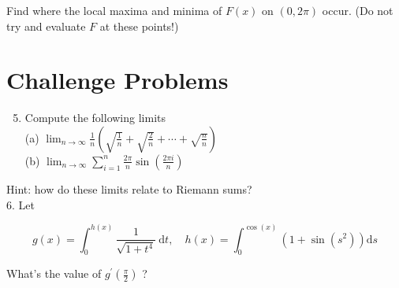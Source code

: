 \documentclass[10pt]{article}
\begin{document}
Find where the local maxima and minima of $F(x)$ on $(0,2 \pi)$ occur. (Do not try and evaluate $F$ at these points!)

\section*{Challenge Problems}
\begin{enumerate}
  \setcounter{enumi}{4}
  \item Compute the following limits\\
(a) $\lim _{n \rightarrow \infty} \frac{1}{n}\left(\sqrt{\frac{1}{n}}+\sqrt{\frac{2}{n}}+\cdots+\sqrt{\frac{n}{n}}\right)$\\
(b) $\lim _{n \rightarrow \infty} \sum_{i=1}^{n} \frac{2 \pi}{n} \sin \left(\frac{2 \pi i}{n}\right)$
\end{enumerate}

Hint: how do these limits relate to Riemann sums?\\
6. Let

$$
g(x)=\int_{0}^{h(x)} \frac{1}{\sqrt{1+t^{4}}} \mathrm{~d} t, \quad h(x)=\int_{0}^{\cos (x)}\left(1+\sin \left(s^{2}\right)\right) \mathrm{d} s
$$

What's the value of $g^{\prime}\left(\frac{\pi}{2}\right)$ ?
\end{document}
